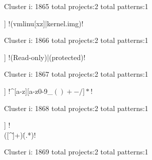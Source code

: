 Cluster i: 1865
total projects:2
total patterns:1
\begin{multicols}{1}
\begin{description}[noitemsep,topsep=0pt]
\item [[2] ] \cverb!(vmlinu[xz]|kernel.img)!
\end{description}
\end{multicols}







Cluster i: 1866
total projects:2
total patterns:1
\begin{multicols}{1}
\begin{description}[noitemsep,topsep=0pt]
\item [[2] ] \cverb!(Read-only)|(protected)!
\end{description}
\end{multicols}







Cluster i: 1867
total projects:2
total patterns:1
\begin{multicols}{1}
\begin{description}[noitemsep,topsep=0pt]
\item [[2] ] \cverb!^[a-z][a-z0-9_$()+-/]*$!
\end{description}
\end{multicols}







Cluster i: 1868
total projects:2
total patterns:1
\begin{multicols}{1}
\begin{description}[noitemsep,topsep=0pt]
\item [[2] ] \cverb!\\\?([^\.]+)\.(.*)!
\end{description}
\end{multicols}







Cluster i: 1869
total projects:2
total patterns:1
\begin{multicols}{1}
\end{multicols}







